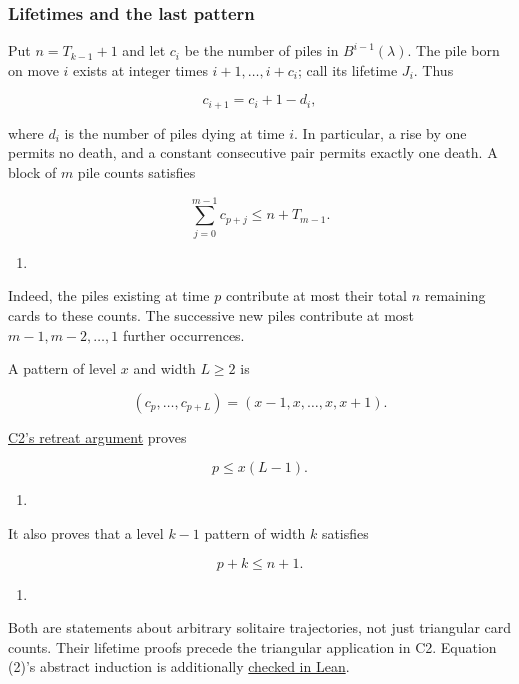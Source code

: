 \documentclass[11pt,a4paper]{article}
\providecommand{\tightlist}{\setlength{\itemsep}{0pt}\setlength{\parskip}{0pt}}
\begin{document}
\subsubsection{Lifetimes and the last pattern}\label{lifetimes-and-the-last-pattern}

Put \(n=T_{k-1}+1\) and let \(c_i\) be the number of piles in \(B^{i-1}(\lambda)\). The pile born on move \(i\) exists at integer times \(i+1,\ldots,i+c_i\); call its lifetime \(J_i\). Thus

\[
c_{i+1}=c_i+1-d_i,
\]

where \(d_i\) is the number of piles dying at time \(i\). In particular, a rise by one permits no death, and a constant consecutive pair permits exactly one death. A block of \(m\) pile counts satisfies

\[
\sum_{j=0}^{m-1}c_{p+j}\le n+T_{m-1}.
\]

\begin{enumerate}
\def\labelenumi{(\arabic{enumi})}
\tightlist
\item
\end{enumerate}

Indeed, the piles existing at time \(p\) contribute at most their total \(n\) remaining cards to these counts. The successive new piles contribute at most \(m-1,m-2,\ldots,1\) further occurrences.

A pattern of level \(x\) and width \(L\ge2\) is

\[
(c_p,\ldots,c_{p+L})=(x-1,x,\ldots,x,x+1).
\]

\href{https://github.com/mpelteshki/climbing-to-the-frontier/blob/212bba53b1818c08c40b8c4b48f636651eaf6410/cagent/p3/c2/upper-bound-proof.md}{C2's retreat argument} proves

\[
p\le x(L-1).
\]

\begin{enumerate}
\def\labelenumi{(\arabic{enumi})}
\setcounter{enumi}{1}
\tightlist
\item
\end{enumerate}

It also proves that a level \(k-1\) pattern of width \(k\) satisfies

\[
p+k\le n+1.
\]

\begin{enumerate}
\def\labelenumi{(\arabic{enumi})}
\setcounter{enumi}{2}
\tightlist
\item
\end{enumerate}

Both are statements about arbitrary solitaire trajectories, not just triangular card counts. Their lifetime proofs precede the triangular application in C2. Equation (2)'s abstract induction is additionally \href{https://github.com/mpelteshki/climbing-to-the-frontier/blob/212bba53b1818c08c40b8c4b48f636651eaf6410/cagent/p3/lean/ProofPursuit/P3/C2SandwichBound.lean}{checked in Lean}.
\end{document}
